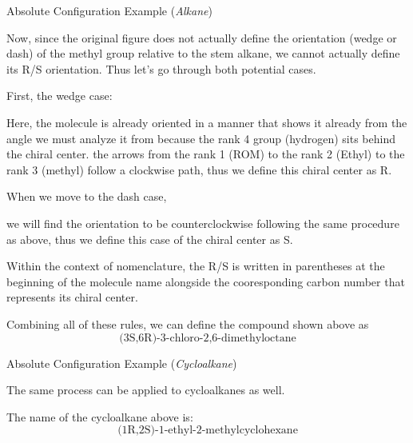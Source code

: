 \documentclass[10pt]{article}
\begin{document}
    \begin{core}{Absolute Configuration Example (\textit{Alkane})}

      Now, since the original figure does not actually define the orientation (wedge or dash) of the methyl group relative to the stem alkane, we cannot actually define its R/S orientation. Thus let's go through both potential cases.

      First, the wedge case:


      Here, the molecule is already oriented in a manner that shows it already from the angle we must analyze it from because the rank 4 group (hydrogen) sits behind the chiral center. the arrows from the rank 1 (ROM) to the rank 2 (Ethyl) to the rank 3 (methyl) follow a clockwise path, thus we define this chiral center as R.


      When we move to the dash case, 


      we will find the orientation to be counterclockwise following the same procedure as above, thus we define this case of the chiral center as S.

      Within the context of nomenclature, the R/S is written in parentheses at the beginning of the molecule name alongside the cooresponding carbon number that represents its chiral center.


      Combining all of these rules, we can define the compound shown above as
      \[
        \text{(3S,6R)-3-chloro-2,6-dimethyloctane}
      \]

    \end{core}

    \begin{core}{Absolute Configuration Example (\textit{Cycloalkane})}

      The same process can be applied to cycloalkanes as well.


      The name of the cycloalkane above is:
      \[
        \text{(1R,2S)-1-ethyl-2-methylcyclohexane}
      \]

    \end{core}
 
\end{document}
